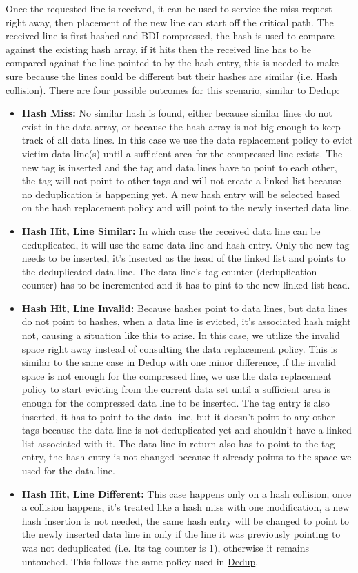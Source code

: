 Once the requested line is received, it can be used to service the miss request right away, then placement of the new line can start off the critical path. The received line is first hashed and BDI compressed, the hash is used to compare against the existing hash array, if it hits then the received line has to be compared against the line pointed to by the hash entry, this is needed to make sure because the lines could be different but their hashes are similar (i.e. Hash collision). There are four possible outcomes for this scenario, similar to \hyperref[sssec:DedupOperations]{Dedup}:
\begin{itemize}
    \item \textbf{Hash Miss:} No similar hash is found, either because similar lines do not exist in the data array, or because the hash array is not big enough to keep track of all data lines. In this case we use the data replacement policy to evict victim data line(s) until a sufficient area for the compressed line exists. The new tag is inserted and the tag and data lines have to point to each other, the tag will not point to other tags and will not create a linked list because no deduplication is happening yet. A new hash entry will be selected based on the hash replacement policy and will point to the newly inserted data line.
    \item \textbf{Hash Hit, Line Similar:} In which case the received data line can be deduplicated, it will use the same data line and hash entry. Only the new tag needs to be inserted, it's inserted as the head of the linked list and points to the deduplicated data line. The data line's tag counter (deduplication counter) has to be incremented and it has to pint to the new linked list head.
    \item \textbf{Hash Hit, Line Invalid:} Because hashes point to data lines, but data lines do not point to hashes, when a data line is evicted, it's associated hash might not, causing a situation like this to arise. In this case, we utilize the invalid space right away instead of consulting the data replacement policy. This is similar to the same case in \hyperref[sssec:DedupOperations]{Dedup} with one minor difference, if the invalid space is not enough for the compressed line, we use the data replacement policy to start evicting from the current data set until a sufficient area is enough for the compressed data line to be inserted. The tag entry is also inserted, it has to point to the data line, but it doesn't point to any other tags because the data line is not deduplicated yet and shouldn't have a linked list associated with it. The data line in return also has to point to the tag entry, the hash entry is not changed because it already points to the space we used for the data line.
    \item \textbf{Hash Hit, Line Different:} This case happens only on a hash collision, once a collision happens, it's treated like a hash miss with one modification, a new hash insertion is not needed, the same hash entry will be changed to point to the newly inserted data line in only if the line it was previously pointing to was not deduplicated (i.e. Its tag counter is 1), otherwise it remains untouched. This follows the same policy used in \hyperref[sssec:DedupOperations]{Dedup}.
\end{itemize}
